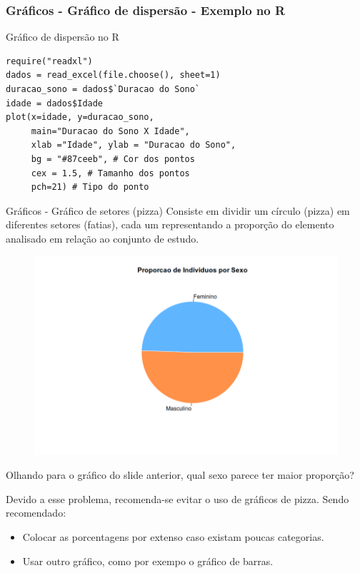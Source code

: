 \begin{frame}[fragile]
    \frametitle{Gráficos - Gráfico de dispersão - Exemplo no R }
    
\begin{block}{Gráfico de dispersão no R}
\begin{verbatim}
require("readxl")
dados = read_excel(file.choose(), sheet=1) 
duracao_sono = dados$`Duracao do Sono`
idade = dados$Idade
plot(x=idade, y=duracao_sono,
     main="Duracao do Sono X Idade",
     xlab ="Idade", ylab = "Duracao do Sono",
     bg = "#87ceeb", # Cor dos pontos
     cex = 1.5, # Tamanho dos pontos
     pch=21) # Tipo do ponto      
\end{verbatim}
    \end{block}
    \end{frame}

\begin{frame}{Gráficos - Gráfico de setores (pizza)}
    Consiste em dividir um círculo (pizza) em diferentes setores (fatias),
     cada um representando a proporção do elemento analisado em relação ao conjunto de estudo. 
    \begin{figure}
        \centering
        \includegraphics[width=0.8\linewidth]{figures/grafico_pizza.png}
    \end{figure}
\end{frame}

\begin{frame}
    \begin{atencao}
        Olhando para o gráfico do slide anterior, qual sexo parece ter maior proporção?
    \end{atencao}
    

    \pause

    Devido a esse problema, recomenda-se evitar o uso de gráficos de pizza. Sendo recomendado:

    \begin{itemize}
        \item Colocar as porcentagens por extenso caso existam poucas categorias.
        \item Usar outro gráfico, como por exempo o gráfico de barras. 
    \end{itemize}
\end{frame}

